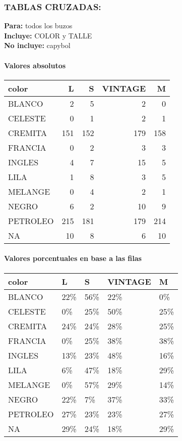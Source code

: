 \documentclass[
]{article}
\begin{document}
\hypertarget{tablas-cruzadas}{%
\subsubsection{TABLAS CRUZADAS:}\label{tablas-cruzadas}}

\textbf{Para:} todos los buzos\\
\textbf{Incluye:} COLOR y TALLE\\
\textbf{No incluye:} capybol

\hypertarget{valores-absolutos}{%
\paragraph{Valores absolutos}\label{valores-absolutos}}

\begin{longtable}[t]{lrrrr}
\toprule
color & L & S & VINTAGE & M\\
\midrule
BLANCO & 2 & 5 & 2 & 0\\
CELESTE & 0 & 1 & 2 & 1\\
CREMITA & 151 & 152 & 179 & 158\\
FRANCIA & 0 & 2 & 3 & 3\\
INGLES & 4 & 7 & 15 & 5\\
\addlinespace
LILA & 1 & 8 & 3 & 5\\
MELANGE & 0 & 4 & 2 & 1\\
NEGRO & 6 & 2 & 10 & 9\\
PETROLEO & 215 & 181 & 179 & 214\\
NA & 10 & 8 & 6 & 10\\
\bottomrule
\end{longtable}

\hypertarget{valores-porcentuales-en-base-a-las-filas}{%
\paragraph{Valores porcentuales en base a las
filas}\label{valores-porcentuales-en-base-a-las-filas}}

\begin{longtable}[t]{lllll}
\toprule
color & L & S & VINTAGE & M\\
\midrule
BLANCO & 22\% & 56\% & 22\% & 0\%\\
CELESTE & 0\% & 25\% & 50\% & 25\%\\
CREMITA & 24\% & 24\% & 28\% & 25\%\\
FRANCIA & 0\% & 25\% & 38\% & 38\%\\
INGLES & 13\% & 23\% & 48\% & 16\%\\
\addlinespace
LILA & 6\% & 47\% & 18\% & 29\%\\
MELANGE & 0\% & 57\% & 29\% & 14\%\\
NEGRO & 22\% & 7\% & 37\% & 33\%\\
PETROLEO & 27\% & 23\% & 23\% & 27\%\\
NA & 29\% & 24\% & 18\% & 29\%\\
\bottomrule
\end{longtable}
\end{document}
